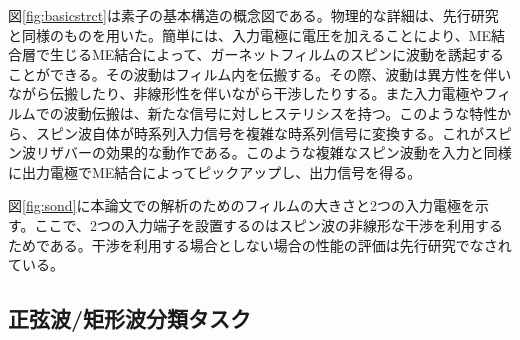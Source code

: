 \documentclass[a4j, twocolumn]{jsarticle}
\begin{document}
図\ref{fig:basicstrct}は素子の基本構造の概念図である。物理的な詳細は、先行研究と同様のものを用いた\cite{Nakane2018IEEEAccess:_Reser_Compu_with_spin_waves_Excit_in_a_Garne_film,Nakane2018ICM:_demon_of_spin_wave_based_reser_compu_for_next_gener_machi_learn_devic}。簡単には、入力電極に電圧を加えることにより、ME結合層で生じるME結合によって、ガーネットフィルムのスピンに波動を誘起することができる。その波動はフィルム内を伝搬する。その際、波動は異方性を伴いながら伝搬したり、非線形性を伴いながら干渉したりする。また入力電極やフィルムでの波動伝搬は、新たな信号に対しヒステリシスを持つ。このような特性から、スピン波自体が時系列入力信号を複雑な時系列信号に変換する。これがスピン波リザバーの効果的な動作である。このような複雑なスピン波動を入力と同様に出力電極でME結合によってピックアップし、出力信号を得る。

図\ref{fig:sond}に本論文での解析のためのフィルムの大きさと2つの入力電極を示す。ここで、2つの入力端子を設置するのはスピン波の非線形な干渉を利用するためである。干渉を利用する場合としない場合の性能の評価は先行研究でなされている\cite{Nakane2018IEEEAccess:_Reser_Compu_with_spin_waves_Excit_in_a_Garne_film,Nakane2018ICM:_demon_of_spin_wave_based_reser_compu_for_next_gener_machi_learn_devic}。

\subsection{正弦波/矩形波分類タスク}
\label{subsec:task}
\end{document}
